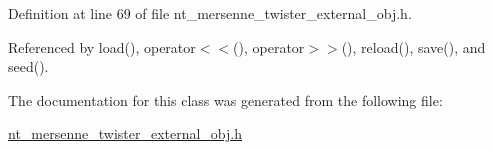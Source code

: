 Definition at line 69 of file nt\_\-mersenne\_\-twister\_\-external\_\-obj.h.



Referenced by load(), operator$<$$<$(), operator$>$$>$(), reload(), save(), and seed().



The documentation for this class was generated from the following file:\begin{DoxyCompactItemize}
\item 
\hyperlink{nt__mersenne__twister__external__obj_8h}{nt\_\-mersenne\_\-twister\_\-external\_\-obj.h}\end{DoxyCompactItemize}
